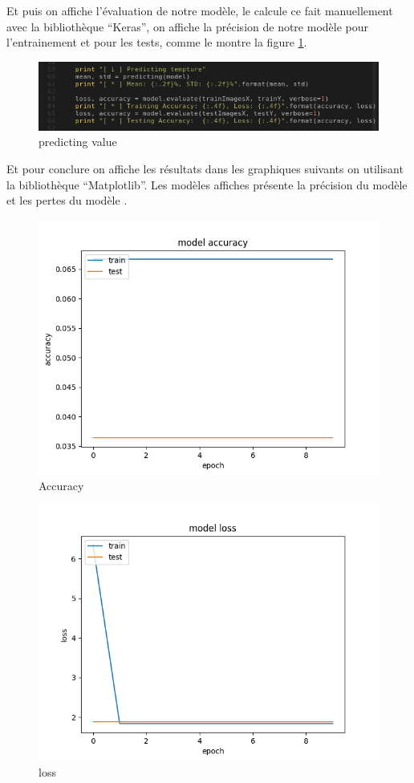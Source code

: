 \documentclass[12pt]{article}
\begin{document}
Et puis on affiche l’évaluation de notre modèle, le calcule ce fait manuellement avec la bibliothèque “Keras”, on affiche la précision de notre modèle pour l’entrainement et pour les tests, comme le montre la figure \ref{fig:prediction}.

\begin{figure}[h]
	\centering
	\includegraphics[width=15cm]{img-Chapiter-4/predicting_value.png}
	\caption{predicting value}
	\label{fig:prediction}
\end{figure}

Et pour conclure on affiche les résultats dans les graphiques suivants on utilisant la bibliothèque “Matplotlib”. Les modèles affiches présente la précision du modèle et les pertes du modèle .
\newpage
\begin{figure}[h]
	\centering
	\includegraphics[width=15cm]{img-Chapiter-4/Figure_1.png}
	\caption{Accuracy}
\end{figure}

\newpage
\begin{figure}[h]
	\centering
	\includegraphics[width=15cm]{img-Chapiter-4/Figure_1-1.png}
	\caption{loss}
\end{figure}


\newpage
{}
	

	
\end{document}
